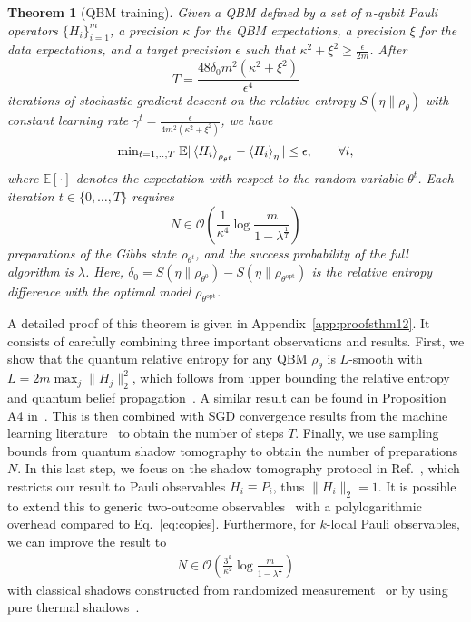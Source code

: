 \documentclass[
    aps,
    prx,
    onecolumn
]{revtex4-2}
\newtheorem{theorem}{Theorem}
\begin{document}
\begin{theorem}[QBM training]
\label{thm:training}
Given a QBM defined by a set of $n$-qubit Pauli operators $\{H_i\}_{i=1}^m$, a precision $\kappa$ for the QBM expectations, a precision $\xi$ for the data expectations, and a target precision $\epsilon$ such that $\kappa^2 + \xi^2 \geq \frac{\epsilon}{2m}$. After 
\begin{equation}
\label{eq:trainingsteps}
T = \frac{48\delta_0 m^2  (\kappa^2 + \xi^2 )}{\epsilon^4}
\end{equation} 
iterations of stochastic gradient descent on the relative entropy $S(\eta \|\rho_\theta)$ with constant learning rate $\gamma^t=\frac{\epsilon}{4m^2(\kappa^2+\xi^2)}$, we have
\begin{equation}
    \mathrm{min}_{t=1,..,T} \; \mathbb{E}| \expval{H_i}_{\rho_{\theta^t}}  - \expval{H_i}_\eta | \leq \epsilon, \qquad \forall i,
\end{equation} where $\mathbb{E}[\cdot]$ denotes the expectation with respect to the random variable $\theta^t$. 
Each iteration $t \in \{0, \dots, T\}$ requires
\begin{equation}
\label{eq:copies}
    N \in \mathcal{O} \left( \frac{1}{{\kappa^4}} \log \frac{ m} { 1-\lambda^{\frac{1}{T}} } \right)
\end{equation}
preparations of the Gibbs state $\rho_{\theta^t}$, and the success probability of the full algorithm is $\lambda$. Here, $\delta_0 = S(\eta\|\rho_{\theta^0})-S(\eta\|\rho_{\theta^\mathrm{opt}})$ is the relative entropy difference with the optimal model $\rho_{\theta^\mathrm{opt}}$.
\end{theorem}

A detailed proof of this theorem is given in Appendix~\ref{app:proofsthm12}. It consists of carefully combining three important observations and results. First, we show that the quantum relative entropy for any QBM $\rho_\theta$ is $L$-smooth with $L=2m\max_j \|H_j\|_2^2$, which follows from upper bounding the relative entropy and quantum belief propagation~\cite{Hastings_2007}. A similar result can be found in Proposition A4 in~\cite{Rouze_2023}. This is then combined with SGD convergence results from the machine learning literature~\cite{Khaled2020, Garrigos2023} to obtain the number of steps $T$. Finally, we use sampling bounds from quantum shadow tomography to obtain the number of preparations $N$. In this last step, we focus on the shadow tomography protocol in Ref.~\cite{Huang_2021}, which restricts our result to Pauli observables $H_i\equiv P_i$, thus $\|H_i\|_2 = 1$. It is possible to extend this to generic two-outcome observables~\cite{Aaronson_2017, Badescu2021} with a polylogarithmic overhead compared to Eq.~\eqref{eq:copies}. Furthermore, for $k$-local Pauli observables, we can improve the result to 
\begin{align}
    N \in \mathcal{O}\left( \frac{3^k}{\kappa^2} \log \frac{ m} { 1-\lambda^{\frac{1}{T}} } \right)
\end{align}
with classical shadows constructed from randomized measurement~\cite{Huang2020} or by using pure thermal shadows~\cite{Coopmans_2023}.
\end{document}
